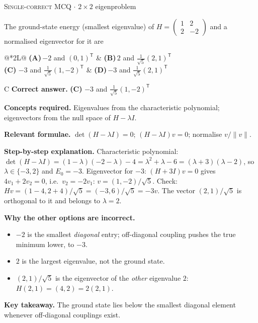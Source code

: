 \documentclass[11pt,a4paper]{article}
\newcommand{\optlabel}[1]{\textbf{(#1)}}
\newcommand{\correctlabel}[1]{\textcolor{okgreen}{\textbf{(#1)}\,\ding{51}}}
\newenvironment{qitem}[1]{\begin{list}{}{\setlength{\leftmargin}{3.3em}\setlength{\labelwidth}{3.1em}%
  \setlength{\labelsep}{0.2em}\setlength{\topsep}{3pt}\setlength{\parsep}{3pt}}\item[\textbf{Q.#1}\hfill]}{\end{list}}
\newcommand{\qsep}{\par\vspace{2pt}{\color{black!15}\hrule}\vspace{4pt}}
\newcommand{\qmeta}[2]{{\footnotesize\color{black!60}\textsc{#1} \;$\cdot$\; #2}\par}
\begin{document}
\begin{qitem}{1}
\qmeta{Single-correct MCQ}{$2\times2$ eigenproblem}
The ground-state energy (smallest eigenvalue) of $H = \begin{pmatrix}1 & 2\\ 2 & -2\end{pmatrix}$ and a normalised eigenvector for it are
\par\smallskip\noindent\begin{tabularx}{\linewidth}{@{}*{2}{L}@{}}
\optlabel{A}\,$-2$ and $(0, 1)^{\mathsf T}$ & \optlabel{B}\,$2$ and $\tfrac{1}{\sqrt5}(2, 1)^{\mathsf T}$ \\[3pt]
\correctlabel{C}\,$-3$ and $\tfrac{1}{\sqrt5}(1, -2)^{\mathsf T}$ & \optlabel{D}\,$-3$ and $\tfrac{1}{\sqrt5}(2, 1)^{\mathsf T}$
\end{tabularx}
\end{qitem}
\begin{solbox}{C}
\textbf{\color{brand}Correct answer.} \textcolor{okgreen}{\textbf{(C)}} $-3$ and $\tfrac{1}{\sqrt5}(1, -2)^{\mathsf T}$

\textbf{\color{brand}Concepts required.} Eigenvalues from the characteristic polynomial; eigenvectors from the null space of $H - \lambda I$.

\textbf{\color{brand}Relevant formulae.} $\det(H - \lambda I) = 0$; $(H - \lambda I)v = 0$; normalise $v/\|v\|$.

\textbf{\color{brand}Step-by-step explanation.} Characteristic polynomial: $\det(H - \lambda I) = (1 - \lambda)(-2 - \lambda) - 4 = \lambda^2 + \lambda - 6 = (\lambda + 3)(\lambda - 2)$,
so $\lambda \in \{-3, 2\}$ and $E_0 = -3$.
Eigenvector for $-3$: $(H + 3I)v = 0$ gives $4v_1 + 2v_2 = 0$, i.e.\ $v_2 = -2v_1$: $v = (1, -2)/\sqrt5$.
Check: $Hv = (1 - 4, 2 + 4)/\sqrt5 = (-3, 6)/\sqrt5 = -3v$. The vector $(2, 1)/\sqrt5$ is orthogonal to it and belongs to $\lambda = 2$.

\textbf{\color{brand}Why the other options are incorrect.}
\begin{itemize}[leftmargin=2.4em, itemsep=1pt, topsep=2pt]
\item[\textbf{(A)}] $-2$ is the smallest \emph{diagonal} entry; off-diagonal coupling pushes the true minimum lower, to $-3$.
\item[\textbf{(B)}] $2$ is the largest eigenvalue, not the ground state.
\item[\textbf{(D)}] $(2, 1)/\sqrt5$ is the eigenvector of the \emph{other} eigenvalue $2$: $H(2,1) = (4, 2) = 2(2, 1)$.
\end{itemize}
\textbf{\color{brand}Key takeaway.} The ground state lies below the smallest diagonal element whenever off-diagonal couplings exist.
\end{solbox}
\qsep
\end{document}
